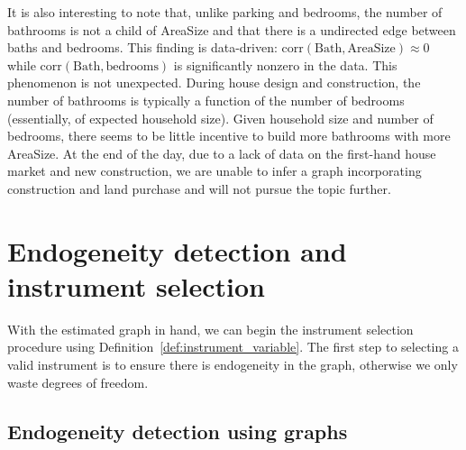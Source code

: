 \documentclass[11pt,review,authoryear]{elsarticle}
\begin{document}
It is also interesting to note that, unlike parking and bedrooms, the number of bathrooms is not a child of AreaSize and that there is a undirected edge between baths and bedrooms. This finding is data-driven: $\mathrm{corr} \left( \mathrm{Bath}, \mathrm{AreaSize} \right) \approx 0$ while $\mathrm{corr} \left( \mathrm{Bath}, \mathrm{bedrooms} \right)$ is significantly nonzero in the data. This phenomenon is not unexpected. During house design and construction, the number of bathrooms is typically a function of the number of bedrooms (essentially, of expected household size). Given household size and number of bedrooms, there seems to be little incentive to build more bathrooms with more AreaSize. At the end of the day, due to a lack of data on the first-hand house market and new construction, we are unable to infer a graph incorporating construction and land purchase and will not pursue the topic further.

\section{Endogeneity detection and instrument selection \label{section:application}}

With the estimated graph in hand, we can begin the instrument selection procedure using Definition~\ref{def:instrument_variable}. The first step to selecting a valid instrument is to ensure there is endogeneity in the graph, otherwise we only waste degrees of freedom.

\subsection{Endogeneity detection using graphs}
\end{document}

